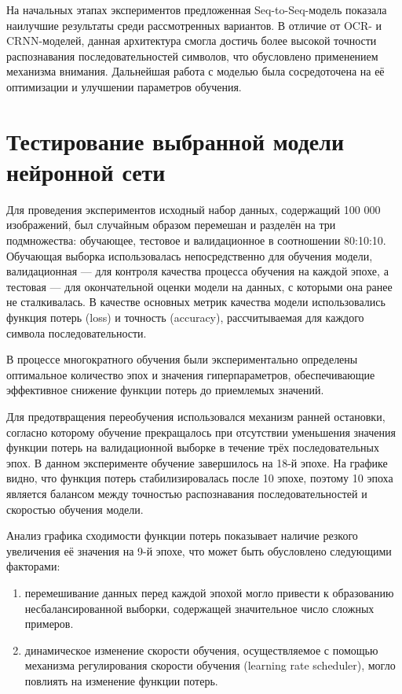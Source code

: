 \documentclass{altsu-report}
\begin{document}
На начальных этапах экспериментов предложенная Seq-to-Seq-модель показала наилучшие результаты среди рассмотренных вариантов. В отличие от OCR- и CRNN-моделей, данная архитектура смогла достичь более высокой точности распознавания последовательностей символов, что обусловлено применением механизма внимания. Дальнейшая работа с моделью была сосредоточена на её оптимизации и улучшении параметров обучения.

\section*{Тестирование выбранной модели нейронной сети}

Для проведения экспериментов исходный набор данных, содержащий 100 000 изображений, был случайным образом перемешан и разделён на три подмножества: обучающее, тестовое и валидационное в соотношении 80:10:10. Обучающая выборка использовалась непосредственно для обучения модели, валидационная — для контроля качества процесса обучения на каждой эпохе, а тестовая — для окончательной оценки модели на данных, с которыми она ранее не сталкивалась. В качестве основных метрик качества модели использовались функция потерь (loss) и точность (accuracy), рассчитываемая для каждого символа последовательности.

В процессе многократного обучения были экспериментально определены оптимальное количество эпох и значения гиперпараметров, обеспечивающие эффективное снижение функции потерь до приемлемых значений. 

Для предотвращения переобучения использовался механизм ранней остановки, согласно которому обучение прекращалось при отсутствии уменьшения значения функции потерь на валидационной выборке в течение трёх последовательных эпох. В данном эксперименте обучение завершилось на 18-й эпохе. На графике видно, что функция потерь стабилизировалась после 10 эпохе, поэтому 10 эпоха является балансом между точностью распознавания последовательностей и скоростью обучения модели.

Анализ графика сходимости функции потерь показывает наличие резкого увеличения её значения на 9-й эпохе, что может быть обусловлено следующими факторами:

\begin{enumerate}
    \item перемешивание данных перед каждой эпохой могло привести к образованию несбалансированной выборки, содержащей значительное число сложных примеров.
    \item динамическое изменение скорости обучения, осуществляемое с помощью механизма регулирования скорости обучения (learning rate scheduler), могло повлиять на изменение функции потерь.
\end{enumerate}
\end{document}
